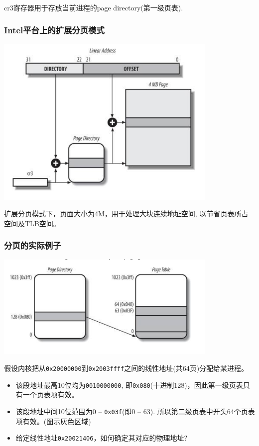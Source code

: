 \documentclass[xcolor=svgnames]{beamer}
\begin{document}
\begin{CJK*}{UTF8}{gbsn}
\begin{frame}[fragile]
cr3寄存器用于存放当前进程的page directory(第一级页表).
\end{frame}

\begin{frame}[fragile]
\frametitle{Intel平台上的扩展分页模式}
\includegraphics[width=0.8\textwidth]{extpaging.png}

扩展分页模式下，页面大小为4M，用于处理大块连续地址空间,
以节省页表所占空间及TLB空间。
\end{frame}

\begin{frame}[fragile]
\frametitle{分页的实际例子}
\includegraphics[width=0.8\textwidth]{examplepaging.png}

假设内核把从\verb|0x20000000|到\verb|0x2003ffff|之间的线性地址(共64页)分配给某进程。
\begin{itemize}
\item 该段地址最高10位均为\verb|0010000000|, 即\verb|0x080|(十进制128)，因此第一级页表只有一个页表项有效。
\item 该段地址中间10位范围为0 -- \verb|0x03f|(即0 -- 63). 所以第二级页表中开头64个页表项有效。(图示灰色区域)
\item 给定线性地址\verb|0x20021406|，如何确定其对应的物理地址?
\end{itemize}

\end{frame}

\end{CJK*}
\end{document}
